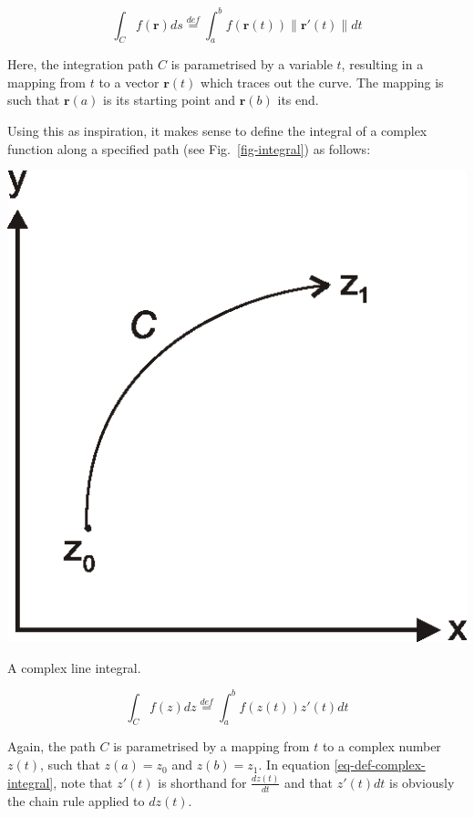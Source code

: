 \begin{equation}
  \int_{C} f(\mathbf{r})ds \stackrel{def}{=} \int_a^b f\left(\mathbf{r}(t)\right) \|  \mathbf{r}'(t) \| dt
  \label{eq-def-line-integral-scalar}
\end{equation}

Here, the integration path $C$ is parametrised by a variable $t$, resulting in a mapping from $t$ to a vector $\mathbf{r}(t)$ which traces out the curve. The mapping is such that $\mathbf{r}(a)$ is its starting point and $\mathbf{r}(b)$ its end.

Using this as inspiration, it makes sense to define the integral of a complex function along a specified path (see Fig.~\ref{fig-integral}) as follows:

\begin{marginfigure}[-4.5cm]
\centering
\includegraphics{complex/figures/integral}
\caption{A complex line integral.}
\label{fig-integral}
\end{marginfigure}

\begin{equation}
  \int_{C}f(z)dz \stackrel{def}{=} \int_a^b f\left(z(t)\right) z'(t) dt
  \label{eq-def-complex-integral}
\end{equation}
  
\noindent{}Again, the path ${C}$ is parametrised by a mapping from $t$ to a complex number $z(t)$, such that $z(a)=z_0$ and $z(b)=z_1$. In equation \ref{eq-def-complex-integral}, note that $z'(t)$ is shorthand for $\frac{dz(t)}{dt}$ and that $z'(t) dt$ is obviously the chain rule applied to $dz(t)$.

